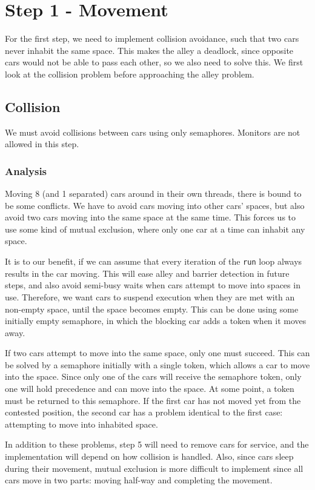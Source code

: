 \section{Step 1 - Movement}
For the first step, we need to implement collision avoidance, such that two cars never inhabit the same space. This makes the alley a deadlock, since opposite cars would not be able to pass each other, so we also need to solve this. We first look at the collision problem before approaching the alley problem.

\subsection{Collision}
We must avoid collisions between cars using only semaphores. Monitors are not allowed in this step.

\subsubsection{Analysis}
Moving 8 (and 1 separated) cars around in their own threads, there is bound to be some conflicts. We have to avoid cars moving into other cars' spaces, but also avoid two cars moving into the same space at the same time. This forces us to use some kind of mutual exclusion, where only one car at a time can inhabit any space.

It is to our benefit, if we can assume that every iteration of the \texttt{run} loop always results in the car moving. This will ease alley and barrier detection in future steps, and also avoid semi-busy waits when cars attempt to move into spaces in use. Therefore, we want cars to suspend execution when they are met with an non-empty space, until the space becomes empty. This can be done using some initially empty semaphore, in which the blocking car adds a token when it moves away.

If two cars attempt to move into the same space, only one must succeed. This can be solved by a semaphore initially with a single token, which allows a car to move into the space. Since only one of the cars will receive the semaphore token, only one will hold precedence and can move into the space. At some point, a token must be returned to this semaphore. If the first car has not moved yet from the contested position, the second car has a problem identical to the first case: attempting to move into inhabited space.

In addition to these problems, step 5 will need to remove cars for service, and the implementation will depend on how collision is handled. Also, since cars sleep during their movement, mutual exclusion is more difficult to implement since all cars move in two parts: moving half-way and completing the movement.

